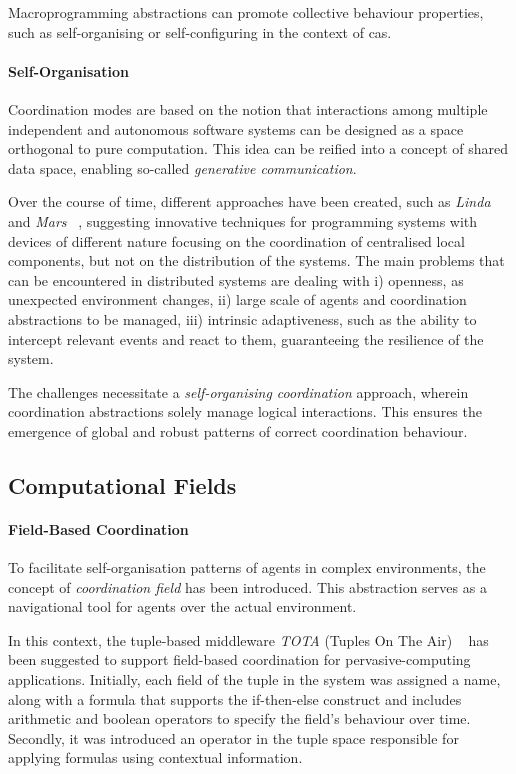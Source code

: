 Macroprogramming abstractions can promote collective behaviour properties, such as self-organising or self-configuring in
the context of \ac{cas}.

\paragraph{Self-Organisation}
Coordination modes are based on the notion that interactions among multiple independent and autonomous software systems
can be designed as a space orthogonal to pure computation.
This idea can be reified into a concept of shared data space, enabling so-called \emph{generative communication}.

Over the course of time, different approaches have been created, such as \emph{Linda} ~\cite{10.1145/2363.2433} and \emph{Mars} ~\cite{865084},
suggesting innovative techniques for programming systems with devices of different nature focusing on the coordination
of centralised local components, but not on the distribution of the systems.
The main problems that can be encountered in distributed systems are dealing with
    i) openness, as unexpected environment changes,
    ii) large scale of agents and coordination abstractions to be managed,
    iii) intrinsic adaptiveness, such as the ability to intercept relevant events and react to them, guaranteeing
        the resilience of the system.

The challenges necessitate a \emph{self-organising coordination} approach, wherein coordination abstractions solely
manage logical interactions.
This ensures the emergence of global and robust patterns of correct coordination behaviour.


\subsection{Computational Fields}
\label{subsec:computational-fields}

\paragraph{Field-Based Coordination}
To facilitate self-organisation patterns of agents in complex environments, the concept of \emph{coordination field}
has been introduced.
This abstraction serves as a navigational tool for agents over the actual environment.

In this context, the tuple-based middleware \emph{TOTA} (Tuples On The Air) ~\cite{10.1145/1538942.1538945}
has been suggested to support field-based coordination for pervasive-computing applications.
Initially, each field of the tuple in the system was assigned a name, along with a formula that supports the
if-then-else construct and includes arithmetic and boolean operators to specify the field's behaviour over time.
Secondly, it was introduced an operator in the tuple space responsible for applying formulas using contextual information.\\

